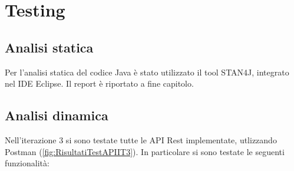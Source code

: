\section{Testing}
\subsection{Analisi statica}
Per l'analisi statica del codice Java è stato utilizzato il tool STAN4J, integrato nel IDE Eclipse. Il report è riportato a fine capitolo.

\subsection{Analisi dinamica}
Nell'iterazione 3 si sono testate tutte le API Rest implementate, utlizzando Postman (\Fig \ref{fig:RisultatiTestAPIIT3}). In particolare si sono testate le seguenti funzionalità:

